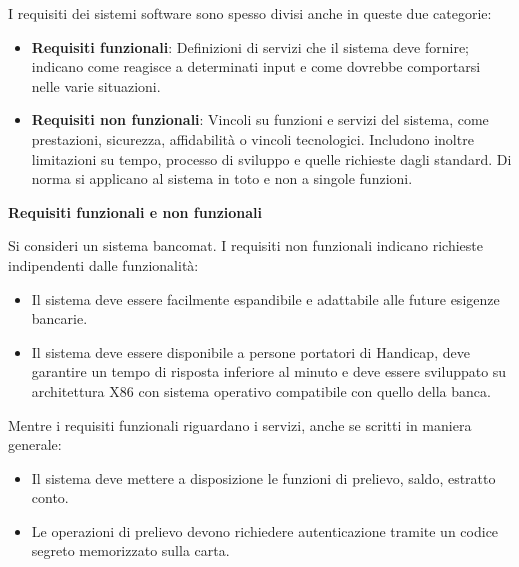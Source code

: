 \noindent I requisiti dei sistemi software sono spesso divisi anche in queste due categorie: \begin{itemize}
	\item \textbf{Requisiti funzionali}: Definizioni di servizi che il sistema deve fornire; indicano come reagisce a determinati input e come dovrebbe
	comportarsi nelle varie situazioni.
	\item \textbf{Requisiti non funzionali}: Vincoli su funzioni e servizi del sistema, come prestazioni, sicurezza, affidabilità o vincoli tecnologici.
	Includono inoltre limitazioni su tempo, processo di sviluppo e quelle richieste dagli standard. Di norma si applicano al sistema in toto e non a
	singole funzioni.
\end{itemize}
\begin{esempio}
	\textbf{Requisiti funzionali e non funzionali}\par
	\noindent Si consideri un sistema bancomat. I requisiti non funzionali indicano richieste indipendenti dalle funzionalità: \begin{itemize}
		\item Il sistema deve essere facilmente espandibile e adattabile alle future esigenze bancarie.
		\item Il sistema deve essere disponibile a persone portatori di Handicap, deve garantire un tempo di risposta inferiore al minuto e deve essere
		sviluppato su architettura X86 con sistema	operativo compatibile con quello della banca.
	\end{itemize}
	\noindent Mentre i requisiti funzionali riguardano i servizi, anche se scritti in maniera generale: \begin{itemize}
		\item Il sistema deve mettere a disposizione le funzioni di prelievo, saldo, estratto conto.
		\item Le operazioni di prelievo devono richiedere autenticazione tramite un codice segreto memorizzato sulla carta.
	\end{itemize}
\end{esempio}

%

